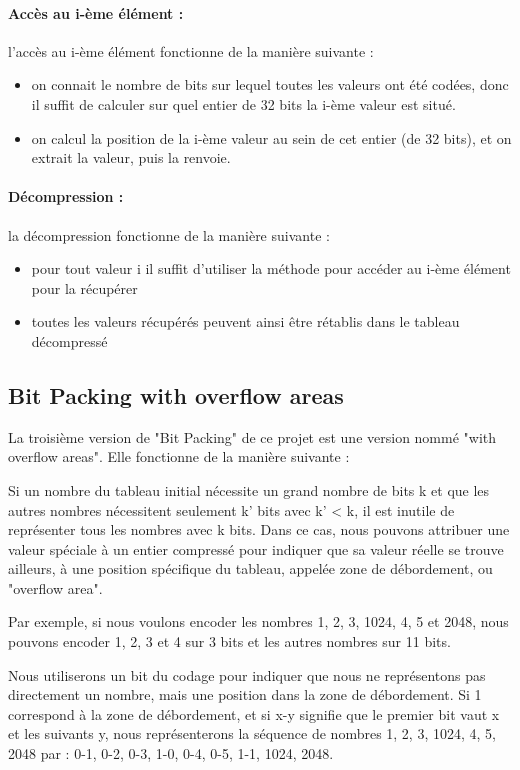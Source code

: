 \documentclass[titlepage]{article}
\begin{document}
\paragraph{Accès au i-ème élément :} l'accès au i-ème élément fonctionne de la manière suivante :
\begin{itemize}
\item on connait le nombre de bits sur lequel toutes les valeurs ont été codées, donc il suffit de calculer sur quel entier de 32 bits la i-ème valeur est situé. 
\item on calcul la position de la i-ème valeur au sein de cet entier (de 32 bits), et on extrait la valeur, puis la renvoie.
\end{itemize}


\paragraph{Décompression :} la décompression fonctionne de la manière suivante :
\begin{itemize}
\item pour tout valeur i il suffit d'utiliser la méthode pour accéder au i-ème élément pour la récupérer 
\item toutes les valeurs récupérés peuvent ainsi être rétablis dans le tableau décompressé
\end{itemize}


\subsection{Bit Packing with overflow areas}

La troisième version de "Bit Packing" de ce projet est une version nommé "with overflow areas". Elle fonctionne de la manière suivante :
\par Si un nombre du tableau initial nécessite un grand nombre de bits k et que les autres nombres nécessitent seulement k' bits avec k' < k, il est inutile de représenter tous les nombres avec k bits. Dans ce cas, nous pouvons attribuer une valeur spéciale à un entier compressé pour indiquer que sa valeur réelle se trouve ailleurs, à une position spécifique du tableau, appelée zone de débordement, ou "overflow area".
\par Par exemple, si nous voulons encoder les nombres 1, 2, 3, 1024, 4, 5 et 2048, nous pouvons encoder 1, 2, 3 et 4 sur 3 bits et les autres nombres sur 11 bits.
\par Nous utiliserons un bit du codage pour indiquer que nous ne représentons pas directement un nombre, mais une position dans la zone de débordement. Si 1 correspond à la zone de débordement, et si x-y signifie que le premier bit vaut x et les suivants y, nous représenterons la séquence de nombres 1, 2, 3, 1024, 4, 5, 2048 par : 0-1, 0-2, 0-3, 1-0, 0-4, 0-5, 1-1, 1024, 2048.
\end{document}
